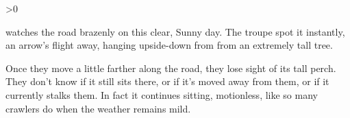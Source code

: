 \ifnum\value{temperature}>0

 watches the road brazenly on this clear, Sunny day.
The troupe spot it instantly, an arrow's flight away, hanging upside-down from from an extremely tall tree.

\chitincrawler

Once they move a little farther along the road, they lose sight of its tall perch.
They don't know if it still sits there, or if it's moved away from them, or if it currently stalks them.
In fact it continues sitting, motionless, like so many \glspl{crawler} do when the weather remains mild.


\fi
